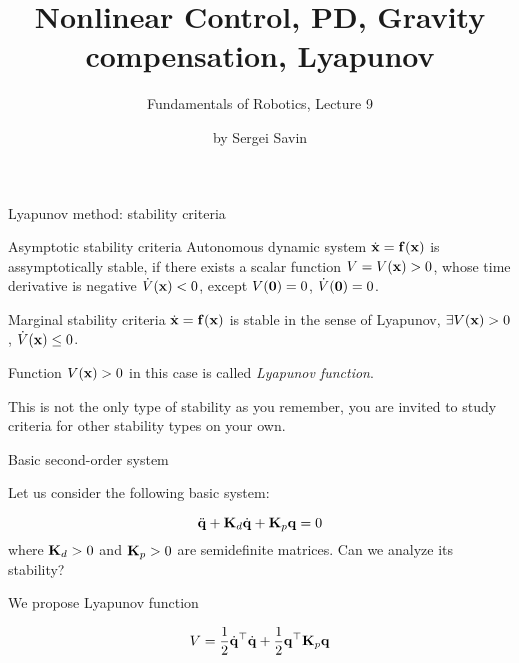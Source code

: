 \documentclass{beamer}
\title{Nonlinear Control, PD, Gravity compensation, Lyapunov}
\subtitle{Fundamentals of Robotics, Lecture 9}
\author{by Sergei Savin}
\date{\mydate}
\begin{document}
\maketitle





\begin{frame}{Lyapunov method: stability criteria}
	\begin{flushleft}
		
		\begin{block}{Asymptotic stability criteria}
			Autonomous dynamic system $\dot{\mathbf{x}} = \mathbf{f}(\mathbf{x})$ is assymptotically stable, if there exists a scalar function $V = V(\mathbf{x}) > 0$, whose time derivative is negative $\dot V(\mathbf{x}) < 0$, except $V(\mathbf{0}) = 0$, $\dot V(\mathbf{0}) = 0$.
		\end{block}
		
		\begin{block}{Marginal stability criteria}
			$\dot{\mathbf{x}} = \mathbf{f}(\mathbf{x})$ is stable in the sense of Lyapunov, $\exists V(\mathbf{x}) > 0$, $\dot V(\mathbf{x}) \leq 0$.
		\end{block}
		
		\begin{definition}
			Function $V(\mathbf{x}) > 0$ in this case is called \emph{Lyapunov function}.
		\end{definition}
		
		\bigskip
		
		This is not the only type of stability as you remember, you are invited to study criteria for other stability types on your own.
		
	\end{flushleft}
\end{frame}


\begin{frame}{Basic second-order system}
	\begin{flushleft}
		
		Let us consider the following basic system:
		
		\begin{equation}
			\ddot{\mathbf{q}} + \mathbf{K}_d \dot{\mathbf{q}} + \mathbf{K}_p\mathbf{q} = 0
		\end{equation}
		where $\mathbf{K}_d > 0$ and $\mathbf{K}_p > 0$ are semidefinite matrices. Can we analyze its stability?
		
		\bigskip
		
		We propose Lyapunov function
		 
		 \begin{equation}
		 	V = \frac{1}{2} \dot{\mathbf{q}}^\top  \dot{\mathbf{q}} + 
		 	       \frac{1}{2} \mathbf{q}^\top \mathbf{K}_p\mathbf{q}
		 \end{equation}
		
	\end{flushleft}
\end{frame}
\end{document}
